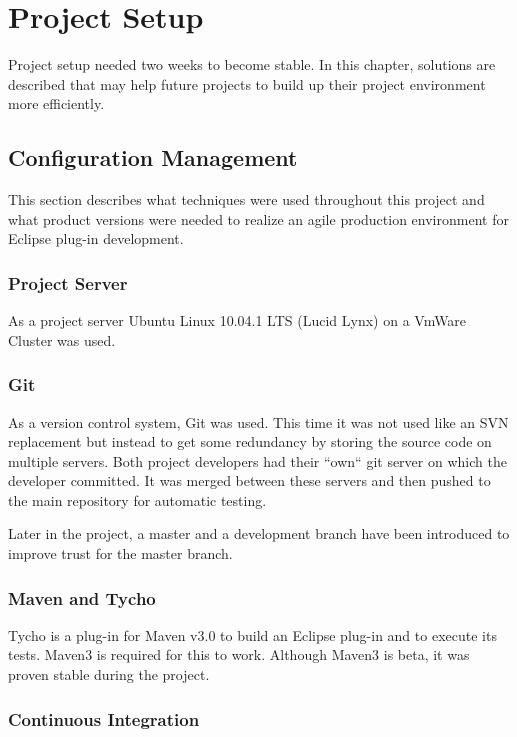 \chapter{Project Setup}
\thispagestyle{fancy}

Project setup needed two weeks to become stable. In this chapter, solutions are 
described that may help future projects to build up their project environment 
more efficiently.

\section{Configuration Management}

This section describes 
what techniques were used throughout this project and what product versions were 
needed to realize an agile production environment for Eclipse plug-in
development.

\subsection{Project Server}

As a project server Ubuntu Linux 10.04.1 LTS (Lucid Lynx) on a VmWare Cluster
was used.

\subsection{Git}

As a version control system, Git\cite{GIT} was used. This time it was not used like an SVN\cite{SVN}
replacement but instead to get some redundancy by storing the source code on
multiple servers. Both project developers had their ``own`` git server on which
the developer committed. It was merged between these servers and then pushed to
the main repository for automatic testing.

Later in the project, a master and a development branch have been introduced to 
improve trust for the master branch.

\subsection{Maven and Tycho}

Tycho\cite{tycho} is a plug-in for Maven\cite{maven} v3.0 to build an Eclipse plug-in and to execute its tests.
Maven3 is required for this to work. Although Maven3 is beta, it was proven
stable during the project.

\subsection{Continuous Integration}

